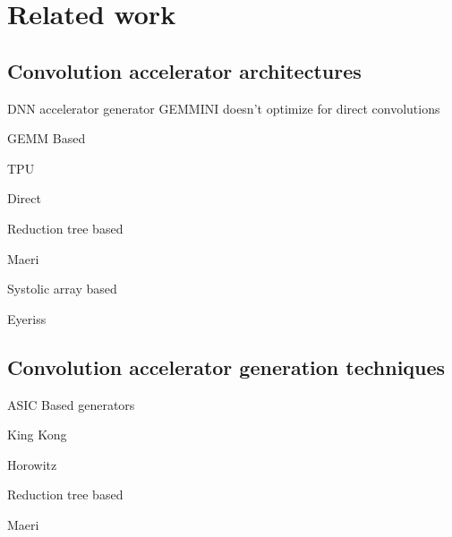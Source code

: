 \chapter{Related work}
\label{chap:related_work}

\section{Convolution accelerator architectures}
 
DNN accelerator generator GEMMINI doesn't optimize for direct convolutions

GEMM Based 

TPU 

Direct 

Reduction tree based 

Maeri 

Systolic array based 

Eyeriss 
 
\section{Convolution accelerator generation techniques}

ASIC Based generators 

King Kong 

Horowitz 

Reduction tree based 

Maeri 

 
